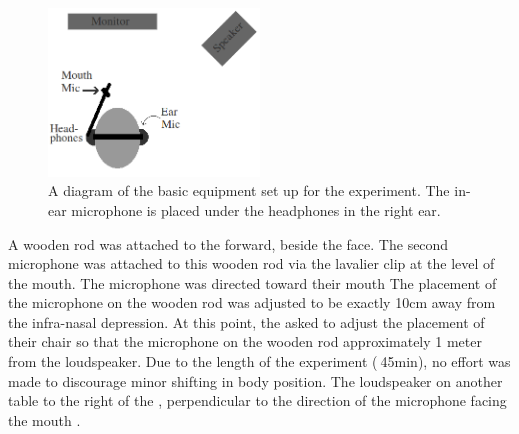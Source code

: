 \begin{figure}
\includegraphics[width=0.5\textwidth]{figure/overallSetUp.png}
\caption{A diagram of the basic equipment set up for the experiment.  The in-ear microphone is placed under the headphones in the right ear.}
\label{fig:overallSetUp}
\end{figure}

A wooden rod was attached to the \DIFdelbegin {}\DIFdelend \DIFaddbegin {}\DIFaddend forward, beside the \DIFdelbegin {}\DIFdelend \DIFaddbegin {}\DIFaddend face.  The second microphone was attached to this wooden rod via the lavalier clip at the level of the \DIFdelbegin {}\DIFdelend \DIFaddbegin {}\DIFaddend mouth.  The microphone was directed toward their mouth \DIFdelbegin {}\DIFdelend \DIFaddbegin {}\DIFaddend The placement of the microphone on the wooden rod was adjusted to be exactly 10cm away from the \DIFdelbegin {}\DIFdelend \DIFaddbegin {}\DIFaddend infra-nasal depression.  At this point, the \DIFdelbegin {}\DIFdelend \DIFaddbegin {}\DIFaddend asked to adjust the placement of their chair so that the microphone on the wooden rod \DIFdelbegin {}\DIFdelend \DIFaddbegin {}\DIFaddend approximately 1 meter from the loudspeaker. Due to the length of the experiment ($~$45min), no effort was made to discourage minor shifting in body position.  The loudspeaker \DIFdelbegin {}\DIFdelend \DIFaddbegin {}\DIFaddend on another table to the right of the \DIFdelbegin {}\DIFdelend \DIFaddbegin {}\DIFaddend , perpendicular to the direction of the microphone facing the mouth \DIFaddbegin {}\DIFaddend .

